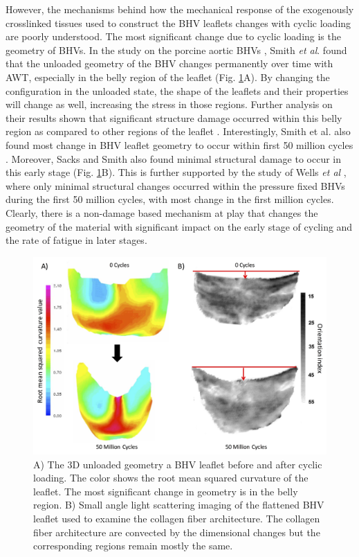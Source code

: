 	However, the mechanisms behind how the mechanical response of the exogenously crosslinked tissues used to construct the BHV leaflets changes with cyclic loading are poorly understood. 
	The most significant change due to cyclic loading is the geometry of BHVs. 
	In the study on the porcine aortic BHVs \cite{smith_high_1997},  Smith \textit{et al}. found that the unloaded geometry of the BHV changes permanently over time with AWT, especially in the belly region of the leaflet (Fig. \ref{fig:PSeffects}A). 
	By changing the configuration in the unloaded state, the shape of the leaflets and their properties will change as well, increasing the stress in those regions. 
	Further analysis on their results shown that significant structure damage occurred within this belly region as compared to other regions of the leaflet \cite{smith_fatigue_1999}.  
	Interestingly, Smith et al. also found most change in BHV leaflet geometry to occur within first 50 million cycles \cite{smith_high_1997}. 
	Moreover, Sacks and Smith \cite{sacks_effects_1998} also found minimal structural damage to occur in this early stage (Fig. \ref{fig:PSeffects}B). 
This is further supported by the study of Wells \textit{et al} \cite{wells_cyclic_2005}, where only minimal structural changes occurred within the pressure fixed BHVs during the first 50 million cycles, with most change in the first million cycles.  
	Clearly, there is a non-damage based mechanism at play that changes the geometry of the material with significant impact on the early stage of cycling and the rate of fatigue in later stages. 
	
\begin{figure}[hbt]
\centering
\includegraphics[width=0.55\paperwidth]{Images/chapter4/figure1.jpg}
\caption{A) The 3D unloaded geometry a BHV leaflet before and after cyclic loading. The color shows the root mean squared curvature of the leaflet. The most significant change in geometry is in the belly region. B) Small angle light scattering imaging of the flattened BHV leaflet used to examine the collagen fiber architecture. The collagen fiber architecture are convected by the dimensional changes but the corresponding regions remain mostly the same.}
\label{fig:PSeffects}
\end{figure}





